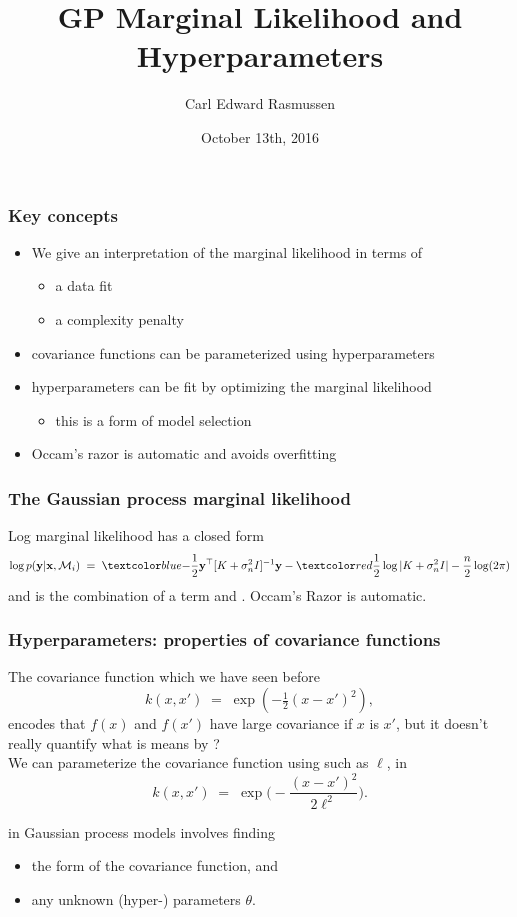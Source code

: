 

\title{GP Marginal Likelihood and Hyperparameters}
\author{Carl Edward Rasmussen}
\date{October 13th, 2016}



\begin{frame}
\titlepage
\end{frame}

\begin{frame}
\frametitle{Key concepts}
\begin{itemize}
\item We give an interpretation of the marginal likelihood in terms of
\begin{itemize}
\item a data fit
\item a complexity penalty
\end{itemize}
\item covariance functions can be parameterized using hyperparameters
\item hyperparameters can be fit by optimizing the marginal likelihood
\begin{itemize}
\item this is a form of model selection
\end{itemize}
\item Occam's razor is automatic and avoids overfitting
\end{itemize}
\end{frame}

\begin{frame}
\frametitle{The Gaussian process marginal likelihood}

Log marginal likelihood has a closed form
\[
\log p({\bf y}|{\bf x},\mathcal{M}_i)\;=\;\Blue{-\frac{1}{2}{\bf y}
^\top [K+\sigma_n^2I]^{-1}{\bf y}}
-\Red{\frac{1}{2}\log|K+\sigma_n^2I|}-\frac{n}{2}\log(2\pi)
\]
and is the combination of a  term and .
Occam's Razor is automatic.
\end{frame}


\begin{frame}
\frametitle{Hyperparameters: properties of covariance functions}

The covariance function which we have seen before
\[
k(x,x')\;=\;\exp(-\tfrac{1}{2}(x-x')^2),
\]
encodes that $f(x)$ and $f(x')$ have large covariance if $x$ is
 $x'$, but it doesn't really quantify what is means by
?\\[1ex]

We can parameterize the covariance function using  such as $\ell$, in
\[
k(x,x')\;=\;\exp\big(-\frac{(x-x')^2}{2\ell^2}\big).
\]

 in Gaussian process models involves finding
\begin{itemize}
\item the form of the covariance function, and
\item any unknown (hyper-) parameters $\theta$.
\end{itemize}

\end{frame}

